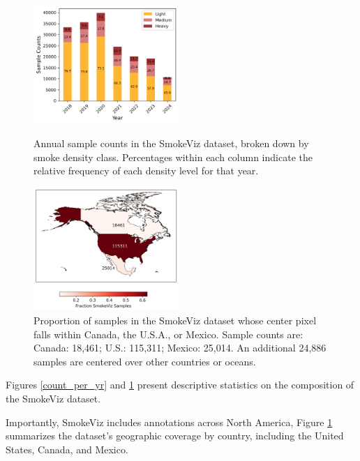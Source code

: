 \documentclass{article}
\begin{document}
\begin{figure}[!htb]
    \parbox{\textwidth}{
      \parbox{0.49\textwidth}{
        \centering
        \includegraphics[width=0.49\textwidth]{stat_figs/sample_count_per_yr_percentages.png}
        \caption{Annual sample counts in the SmokeViz dataset, broken down by smoke density class. Percentages within each column indicate the relative frequency of each density level for that year.}
        \label{count_per_yr}
      }
    \hspace{0.01\textwidth}
      \parbox{0.49\textwidth}{
        \centering
        \includegraphics[width=0.49\textwidth]{stat_figs/sample_percent_country.png}
        \caption{Proportion of samples in the SmokeViz dataset whose center pixel falls within Canada, the U.S.A., or Mexico. Sample counts are: Canada: 18,461; U.S.: 115,311; Mexico: 25,014. An additional 24,886 samples are centered over other countries or oceans.}
        \label{count_per_country}
      }
    }
\end{figure}

Figures \ref{count_per_yr} and \ref{count_per_country} present descriptive statistics on the composition of the SmokeViz dataset. 

Importantly, SmokeViz includes annotations across North America, Figure \ref{count_per_country} summarizes the dataset's geographic coverage by country, including the United States, Canada, and Mexico.
\end{document}
